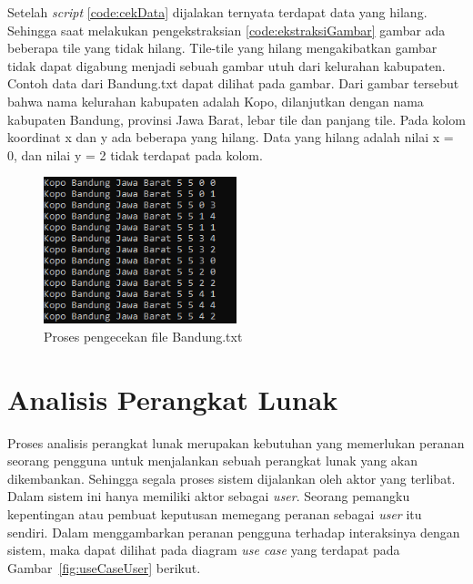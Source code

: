 Setelah \textit{script} \ref{code:cekData} dijalakan ternyata terdapat data yang hilang. Sehingga saat melakukan pengekstraksian \ref{code:ekstraksiGambar} gambar ada beberapa tile yang tidak hilang. Tile-tile yang hilang mengakibatkan gambar tidak dapat digabung menjadi sebuah gambar utuh dari kelurahan kabupaten. Contoh data dari Bandung.txt dapat dilihat pada gambar. Dari gambar tersebut bahwa nama kelurahan kabupaten adalah Kopo, dilanjutkan dengan nama kabupaten Bandung, provinsi Jawa Barat, lebar tile dan panjang tile. Pada kolom koordinat x dan y ada beberapa yang hilang. Data yang hilang adalah nilai x = 0, dan nilai y = 2 tidak terdapat pada kolom.
\begin{figure}[H]
	\centering
	\includegraphics[width=0.5\textwidth]{Gambar/kabupatenKopo.png}
	\caption{Proses pengecekan file Bandung.txt}
	\label{fig:kabupatenKopo}
\end{figure}  

\section{Analisis Perangkat Lunak}
Proses analisis perangkat lunak merupakan kebutuhan yang memerlukan peranan seorang pengguna untuk menjalankan sebuah perangkat lunak yang akan dikembankan. Sehingga segala proses sistem dijalankan oleh aktor yang terlibat. Dalam sistem ini hanya memiliki aktor sebagai \textit{user}. Seorang pemangku kepentingan atau pembuat keputusan memegang peranan sebagai \textit{user} itu sendiri. Dalam menggambarkan peranan pengguna terhadap interaksinya dengan sistem, maka dapat dilihat pada diagram \textit{use case} yang terdapat pada Gambar~\ref{fig:useCaseUser} berikut.

